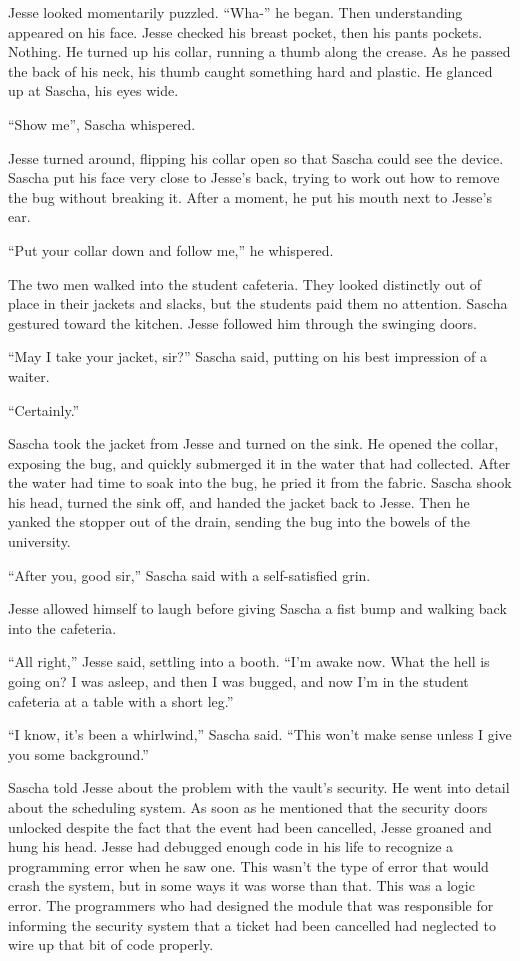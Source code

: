 \documentclass[12pt]{book}
\begin{document}
Jesse looked momentarily puzzled.  ``Wha-'' he began.  Then understanding appeared on his face.  Jesse checked his breast pocket, then his pants pockets.  Nothing.  He turned up his collar, running a thumb along the crease.  As he passed the back of his neck, his thumb caught something hard and plastic.  He glanced up at Sascha, his eyes wide.

``Show me'', Sascha whispered.

Jesse turned around, flipping his collar open so that Sascha could see the device.  Sascha put his face very close to Jesse's back, trying to work out how to remove the bug without breaking it.  After a moment, he put his mouth next to Jesse's ear.

``Put your collar down and follow me,'' he whispered.

The two men walked into the student cafeteria.  They looked distinctly out of place in their jackets and slacks, but the students paid them no attention.  Sascha gestured toward the kitchen.  Jesse followed him through the swinging doors.

``May I take your jacket, sir?'' Sascha said, putting on his best impression of a waiter.

``Certainly.''

Sascha took the jacket from Jesse and turned on the sink.  He opened the collar, exposing the bug, and quickly submerged it in the water that had collected.  After the water had time to soak into the bug, he pried it from the fabric.  Sascha shook his head, turned the sink off, and handed the jacket back to Jesse.  Then he yanked the stopper out of the drain, sending the bug into the bowels of the university.

``After you, good sir,'' Sascha said with a self-satisfied grin.

Jesse allowed himself to laugh before giving Sascha a fist bump and walking back into the cafeteria.

``All right,'' Jesse said, settling into a booth.  ``I'm awake now.  What the hell is going on?  I was asleep, and then I was bugged, and now I'm in the student cafeteria at a table with a short leg.''

``I know, it's been a whirlwind,'' Sascha said.  ``This won't make sense unless I give you some background.''

Sascha told Jesse about the problem with the vault's security.  He went into detail about the scheduling system.  As soon as he mentioned that the security doors unlocked despite the fact that the event had been cancelled, Jesse groaned and hung his head.  Jesse had debugged enough code in his life to recognize a programming error when he saw one.  This wasn't the type of error that would crash the system, but in some ways it was worse than that.  This was a logic error.  The programmers who had designed the module that was responsible for informing the security system that a ticket had been cancelled had neglected to wire up that bit of code properly.
\end{document}
